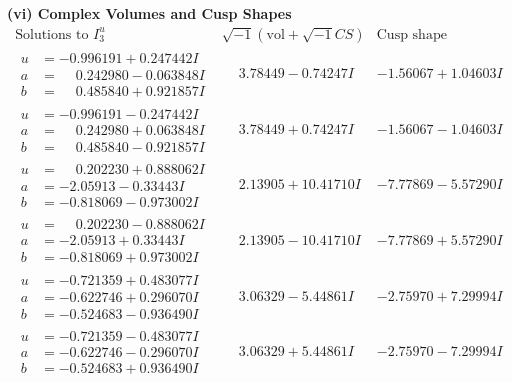 \documentclass[1p]{elsarticle_modified}
\theoremstyle{definition}
\newcommand{\I}{\sqrt{-1}}
\begin{document}
\newpage\flushleft \textbf{(vi) Complex Volumes and Cusp Shapes}
$$\begin{array}{c|c|c}  
\text{Solutions to }I^u_{3}& \I (\text{vol} + \sqrt{-1}CS) & \text{Cusp shape}\\
 \hline 
\begin{aligned}
u &= -0.996191 + 0.247442 I \\
a &= \phantom{-}0.242980 - 0.063848 I \\
b &= \phantom{-}0.485840 + 0.921857 I\end{aligned}
 & \phantom{-}3.78449 - 0.74247 I & -1.56067 + 1.04603 I \\ \hline\begin{aligned}
u &= -0.996191 - 0.247442 I \\
a &= \phantom{-}0.242980 + 0.063848 I \\
b &= \phantom{-}0.485840 - 0.921857 I\end{aligned}
 & \phantom{-}3.78449 + 0.74247 I & -1.56067 - 1.04603 I \\ \hline\begin{aligned}
u &= \phantom{-}0.202230 + 0.888062 I \\
a &= -2.05913 - 0.33443 I \\
b &= -0.818069 - 0.973002 I\end{aligned}
 & \phantom{-}2.13905 + 10.41710 I & -7.77869 - 5.57290 I \\ \hline\begin{aligned}
u &= \phantom{-}0.202230 - 0.888062 I \\
a &= -2.05913 + 0.33443 I \\
b &= -0.818069 + 0.973002 I\end{aligned}
 & \phantom{-}2.13905 - 10.41710 I & -7.77869 + 5.57290 I \\ \hline\begin{aligned}
u &= -0.721359 + 0.483077 I \\
a &= -0.622746 + 0.296070 I \\
b &= -0.524683 - 0.936490 I\end{aligned}
 & \phantom{-}3.06329 - 5.44861 I & -2.75970 + 7.29994 I \\ \hline\begin{aligned}
u &= -0.721359 - 0.483077 I \\
a &= -0.622746 - 0.296070 I \\
b &= -0.524683 + 0.936490 I\end{aligned}
 & \phantom{-}3.06329 + 5.44861 I & -2.75970 - 7.29994 I \\ \hline\begin{aligned}

\end{aligned}
\end{array}$$
\end{document}
